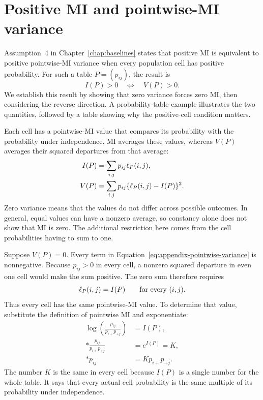 \section{Positive MI and pointwise-MI variance}
\label{sec:mi-variance-equivalence}

Assumption~4 in Chapter~\ref{chap:baselines} states that positive MI is
equivalent to positive pointwise-MI variance when every population cell
has positive probability. For such a table \(P=(p_{ij})\), the result is
\begin{equation}
 I(P)>0\quad\Longleftrightarrow\quad V(P)>0.
 \label{eq:positive-mi-variance-equivalence}
\end{equation}
We establish this result by showing that zero variance forces zero MI,
then considering the reverse direction. A probability-table example
illustrates the two quantities, followed by a table showing why the
positive-cell condition matters.

\medskip
{}

Each cell has a pointwise-MI value that compares its probability with
the probability under independence. MI averages these values, whereas
\(V(P)\) averages their squared departures from that average:
\begin{align}
 I(P)&=\sum_{i,j}p_{ij}\ell_P(i,j),\\*
 V(P)&=\sum_{i,j}p_{ij}\{\ell_P(i,j)-I(P)\}^2.
 \label{eq:appendix-pointwise-variance}
\end{align}
Zero variance means that the values do not differ across possible
outcomes. In general, equal values can have a nonzero average, so
constancy alone does not show that MI is zero. The additional restriction
here comes from the cell probabilities having to sum to one.

\medskip
{}

Suppose \(V(P)=0\). Every term in
Equation~\eqref{eq:appendix-pointwise-variance} is nonnegative. Because
\(p_{ij}>0\) in every cell, a nonzero squared departure in even one
cell would make the sum positive. The zero sum therefore requires
\begin{equation}
 \ell_P(i,j)=I(P)\qquad\text{for every }(i,j).
\end{equation}
Thus every cell has the same pointwise-MI value. To determine that value,
substitute the definition of pointwise MI and exponentiate:
\begin{align}
 \log\left(\frac{p_{ij}}{p_{i+}p_{+j}}\right)&=I(P),\\*
 \frac{p_{ij}}{p_{i+}p_{+j}}&=e^{I(P)}=K,\\*
 p_{ij}&=Kp_{i+}p_{+j}.
 \label{eq:constant-pointwise-mi-ratio}
\end{align}
The number \(K\) is the same in every cell because \(I(P)\) is a
single number for the whole table. It says that every actual cell
probability is the same multiple of its probability under independence.

